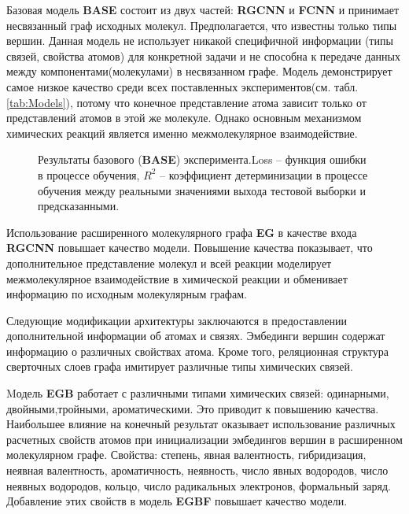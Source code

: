 \documentclass[12pt, twoside]{article}
\begin{document}
Базовая модель \textbf{BASE} состоит из двух частей: \textbf{RGCNN} и \textbf{FCNN} и принимает несвязанный граф исходных молекул. Предполагается, что известны только типы вершин. Данная модель не использует никакой специфичной информации (типы связей, свойства атомов) для конкретной задачи и не способна к передаче данных между компонентами(молекулами) в несвязанном графе. Модель демонстрирует самое низкое качество среди всех поставленных экспериментов(см. табл. \ref{tab:Models}), потому что конечное представление атома зависит только от представлений атомов в этой же молекуле. Однако основным механизмом химических реакций является именно межмолекулярное взаимодействие. 

 \begin{figure}[h!]
    
 \caption{\label{fig:BASE} Результаты базового (\textbf{BASE}) эксперимента.Loss -- функция ошибки в процессе обучения, $R^2$ -- коэффициент детерминизации в процессе обучения между реальными значениями выхода тестовой выборки и предсказанными.}
\end{figure}




 Использование расширенного молекулярного графа \textbf{EG} в качестве входа \textbf{RGCNN} повышает качество модели. Повышение качества показывает, что дополнительное представление молекул и всей реакции моделирует межмолекулярное взаимодействие в химической реакции и обменивает информацию по исходным молекулярным графам. 
 
 Следующие модификации архитектуры заключаются в предоставлении дополнительной информации об атомах и связях. 
Эмбединги вершин содержат информацию о различных свойствах атома. Кроме того, реляционная структура сверточных слоев графа имитирует различные типы химических связей.
 
 Mодель \textbf{EGB} работает с различными типами химических связей: одинарными, двойными,тройными, ароматическими. Это приводит к повышению качества. 
 Наибольшее влияние на конечный результат оказывает использование различных расчетных свойств атомов при инициализации эмбедингов вершин в расширенном молекулярном графе. Свойства: степень, явная валентность, гибридизация, неявная валентность, ароматичность, неявность, число явных водородов, число неявных водородов, кольцо, число радикальных электронов, формальный заряд. Добавление этих  свойств в модель \textbf{EGBF} повышает качество модели. 
 
\end{document}
